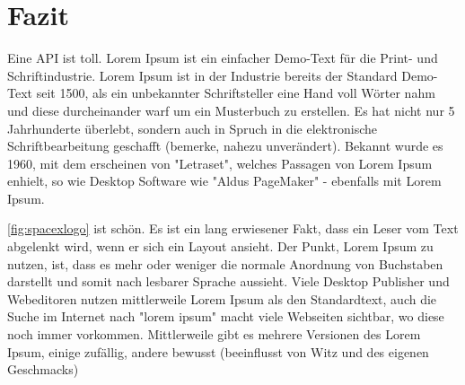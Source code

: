 \documentclass[%
    auto-generate   = true,             %
    debug           = true,             %
    print-ndn       = true,             %
    print-loa       = true,             %
    print-lof       = true,             %
    print-lot       = true,             %
    print-lol       = true,             %
    bib-file        = literature.bib,   %
    plantuml        = true              %
]{udhbwvst}
\begin{document}
\blinddocument{}

\section{Fazit}

Eine \ac{API} ist toll.
Lorem Ipsum ist ein einfacher Demo-Text für die Print- und Schriftindustrie. Lorem Ipsum ist in der Industrie bereits der Standard Demo-Text seit 1500, als ein unbekannter Schriftsteller eine Hand voll Wörter nahm und diese durcheinander warf um ein Musterbuch zu erstellen. Es hat nicht nur 5 Jahrhunderte überlebt, sondern auch in Spruch in die elektronische Schriftbearbeitung geschafft (bemerke, nahezu unverändert). Bekannt wurde es 1960, mit dem erscheinen von "Letraset", welches Passagen von Lorem Ipsum enhielt, so wie Desktop Software wie "Aldus PageMaker" - ebenfalls mit Lorem Ipsum.


\autoref{fig:spacexlogo} ist schön. Es ist ein lang erwiesener Fakt, dass ein Leser vom Text abgelenkt wird, wenn er sich ein Layout ansieht. Der Punkt, Lorem Ipsum zu nutzen, ist, dass es mehr oder weniger die normale Anordnung von Buchstaben darstellt und somit nach lesbarer Sprache aussieht. Viele Desktop Publisher und Webeditoren nutzen mittlerweile Lorem Ipsum als den Standardtext, auch die Suche im Internet nach "lorem ipsum" macht viele Webseiten sichtbar, wo diese noch immer vorkommen. Mittlerweile gibt es mehrere Versionen des Lorem Ipsum, einige zufällig, andere bewusst (beeinflusst von Witz und des eigenen Geschmacks)
\end{document}
